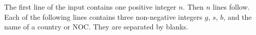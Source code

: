The first line of the input contains one positive integer $n$.
Then $n$ lines follow. 
Each of the following lines contains three non-negative integers
$g$, $s$, $b$, and the name of a country or NOC.
They are separated by blanks.

